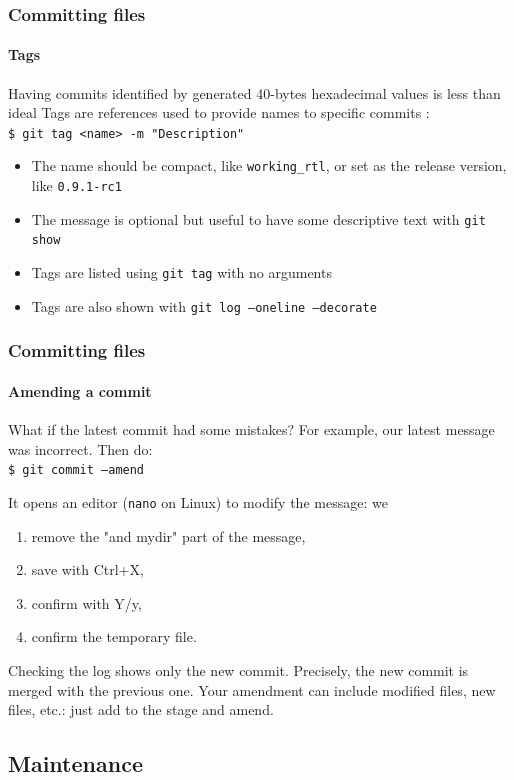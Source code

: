 \begin{frame}
\frametitle{Committing files}
\framesubtitle{Tags}

\begin{block}{Having commits identified by generated 40-bytes hexadecimal values is less than ideal}
Tags are references used to provide names to specific commits : \\
\texttt{\$ git tag <name> -m "Description"} \\

\medskip
\begin{itemize}
\item The name should be compact, like \texttt{working\_rtl}, or set as the release version, like \texttt{0.9.1-rc1}
\item The message is optional but useful to have some descriptive text with \texttt{git show}
\item Tags are listed using \texttt{git tag} with no arguments
\item Tags are also shown with \texttt{git log ---oneline ---decorate}
\end{itemize}
\end{block}
\end{frame}

\begin{frame}
\frametitle{Committing files}
\framesubtitle{Amending a commit}

\begin{block}{What if the latest commit had some mistakes?}
For example, our latest message was incorrect. Then do: \\
\texttt{\$ git commit ---amend}

\medskip
It opens an editor (\texttt{nano} on Linux) to modify the message: we 
\begin{enumerate}
\item remove the "and mydir" part of the message,
\item save with Ctrl+X,
\item confirm with Y/y,
\item confirm the temporary file.
\end{enumerate}
Checking the log shows only the new commit. Precisely, the new commit is merged with the previous one. Your amendment can include modified files, new files, etc.: just add to the stage and amend.
\end{block}
\end{frame}

\subsection{Maintenance}

